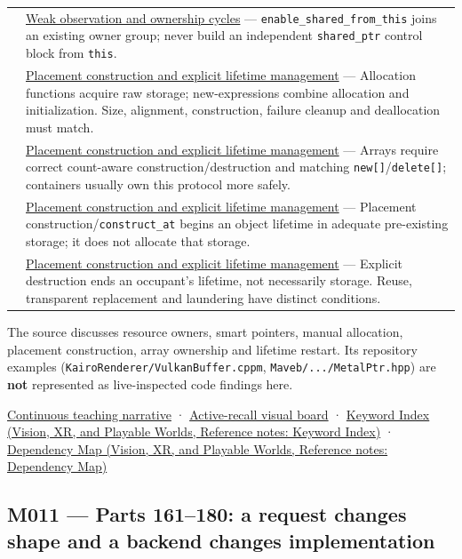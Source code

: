 {\begin{longtable}[]{@{}
  >{\raggedright\arraybackslash}p{}
  >{\raggedright\arraybackslash}p{}@{}}
156 & \hyperref[appendix-b9548675eb2b]{Weak observation and ownership cycles} --- \texttt{enable\_shared\_from\_this} joins an existing owner group; never build an independent \texttt{shared\_ptr} control block from \texttt{this}. \\
157 & \hyperref[appendix-f56c3e43fd4e]{Placement construction and explicit lifetime management} --- Allocation functions acquire raw storage; new-expressions combine allocation and initialization. Size, alignment, construction, failure cleanup and deallocation must match. \\
158 & \hyperref[appendix-f56c3e43fd4e]{Placement construction and explicit lifetime management} --- Arrays require correct count-aware construction/destruction and matching \texttt{new{[}{]}}/\texttt{delete{[}{]}}; containers usually own this protocol more safely. \\
159 & \hyperref[appendix-f56c3e43fd4e]{Placement construction and explicit lifetime management} --- Placement construction/\texttt{construct\_at} begins an object lifetime in adequate pre-existing storage; it does not allocate that storage. \\
160 & \hyperref[appendix-f56c3e43fd4e]{Placement construction and explicit lifetime management} --- Explicit destruction ends an occupant's lifetime, not necessarily storage. Reuse, transparent replacement and laundering have distinct conditions. \\
\end{longtable}
}

The source discusses resource owners, smart pointers, manual allocation, placement construction, array ownership and lifetime restart. Its repository examples (\texttt{KairoRenderer/VulkanBuffer.cppm}, \texttt{Maveb/.../MetalPtr.hpp}) are \textbf{not} represented as live-inspected code findings here.

\hyperref[01-foundations-i-ch004-from-a-live-object-to-responsible-resource-ownership]{Continuous teaching narrative} · \hyperref[appendix-960160274237]{Active-recall visual board} · \href{../07-Vision-XR-and-Playable-Worlds/main.pdf\#nameddest=appendix-a6d556a4ef50}{Keyword Index (Vision, XR, and Playable Worlds, Reference notes: Keyword Index)} · \href{../07-Vision-XR-and-Playable-Worlds/main.pdf\#nameddest=appendix-4ad47bdd269a}{Dependency Map (Vision, XR, and Playable Worlds, Reference notes: Dependency Map)}

\subsection{M011 --- Parts 161--180: a request changes shape and a backend changes implementation}\label{appendix-fd090d982a15-m011-parts-161180-a-request-changes-shape-and-a-backend-changes-implementation}

